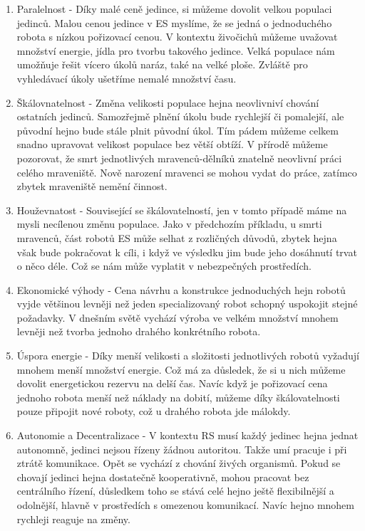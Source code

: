     \begin{enumerate}
        \item Paralelnost - Díky malé ceně jedince, si můžeme dovolit velkou populaci jedinců. Malou cenou jedince v ES myslíme, že se jedná o jednoduchého robota s nízkou pořizovací cenou. V kontextu živočichů můžeme uvažovat množství energie, jídla pro tvorbu takového jedince. Velká populace nám umožňuje řešit vícero úkolů naráz, také na velké ploše. Zvláště pro vyhledávací úkoly ušetříme nemalé množství času. 
        \item Škálovnatelnost - Změna velikosti populace hejna neovlivniví chování ostatních jedinců. Samozřejmě plnění úkolu bude rychlejší či pomalejší, ale původní hejno bude stále plnit původní úkol. Tím pádem můžeme celkem snadno upravovat velikost populace bez větší obtíží. V přírodě můžeme pozorovat, že smrt  jednotlivých mravenců-dělníků znatelně neovlivní práci celého mraveniště. Nově narození mravenci se mohou vydat do práce, zatímco zbytek mraveniště nemění činnost. 
        \item Houževnatost - Související se škálovatelností, jen v tomto případě máme na mysli necílenou změnu populace. Jako v předchozím příkladu, u smrti mravenců, část robotů ES může selhat z rozličných důvodů, zbytek hejna však bude pokračovat k cíli, i když ve výsledku jim bude jeho dosáhnutí trvat o něco déle. Což se nám může vyplatit v nebezpečných prostředích. 
        \item Ekonomické výhody - Cena návrhu a konstrukce jednoduchých hejn robotů vyjde většinou levněji než jeden specializovaný robot schopný uspokojit stejné požadavky. V dnešním světě vychází výroba ve velkém množství mnohem levněji než tvorba jednoho drahého konkrétního robota.
        \item Úspora energie - Díky menší velikosti a složitosti jednotlivých robotů vyžadují mnohem menší množství energie. Což má za důsledek, že si u nich můžeme dovolit energetickou rezervu na delší čas. Navíc když je pořizovací cena jednoho robota menší než náklady na dobití, můžeme díky škálovatelnosti pouze připojit nové roboty, což u drahého robota jde málokdy. 
        \item Autonomie a Decentralizace - V kontextu RS musí každý jedinec hejna jednat autonomně, jedinci nejsou řízeny žádnou autoritou. Takže umí pracuje i při ztrátě komunikace. Opět se vychází z chování živých organismů. Pokud se chovají jedinci hejna dostatečně kooperativně, mohou pracovat bez centrálního řízení, důsledkem toho se stává celé hejno ještě flexibilnější a odolnější, hlavně v prostředích s omezenou komunikací. Navíc hejno mnohem rychleji reaguje na změny. 
    \end{enumerate}
